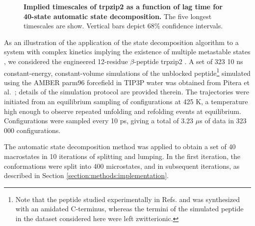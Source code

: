 \begin{figure}[tbp]
  \begin{center}
  \end{center}
  \caption{{\bf Implied timescales of trpzip2 as a function of lag time for 40-state automatic state decomposition.}  The five longest timescales are show.  Vertical bars depict 68\% confidence intervals.}
  \label{figure:trpzip2-timescales}
\end{figure}

As an illustration of the application of the state decomposition algorithm to a system with complex kinetics implying the existence of multiple metastable states \cite{yang:2004c}, we considered the engineered 12-residue $\beta$-peptide trpzip2 \cite{cochran:2001a}.
A set of 323 10 ns constant-energy, constant-volume simulations of the unblocked peptide\footnote{Note that the peptide studied experimentally in Refs. \cite{cochran:2001a} and \cite{yang:2004c} was synthesized with an amidated C-terminus, whereas the termini of the simulated peptide in the dataset considered here were left zwitterionic.} simulated using the AMBER parm96 forcefield \cite{AMBER-parm96} in TIP3P water \cite{jorgensen:1983a} was obtained from Pitera et al.\ \cite{pitera:2006a}; 
details of the simulation protocol are provided therein.
The trajectories were initiated from an equilibrium sampling of configurations at 425 K, a temperature high enough to observe repeated unfolding and refolding events at equilibrium.
Configurations were sampled every 10 ps, giving a total of 3.23 $\mu$s of data in 323 000 configurations.

The automatic state decomposition method was applied to obtain a set of 40 macrostates in 10 iterations of splitting and lumping.
In the first iteration, the conformations were split into 400 microstates, and in subsequent iterations, as described in Section \ref{section:methods:implementation}.

